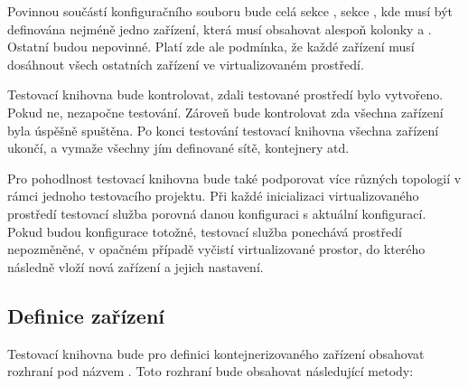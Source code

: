 Povinnou součástí konfiguračního souboru bude celá sekce , sekce , kde musí být definována nejméně jedno zařízení, která musí obsahovat alespoň kolonky  a . Ostatní budou nepovinné. Platí zde ale podmínka, že každé zařízení musí dosáhnout všech ostatních zařízení ve virtualizovaném prostředí.

Testovací knihovna bude kontrolovat, zdali testované prostředí bylo vytvořeno. Pokud ne, nezapočne testování. Zároveň bude kontrolovat zda všechna zařízení byla úspěšně spuštěna. Po konci testování testovací knihovna všechna zařízení ukončí, a vymaže všechny jím definované sítě, kontejnery atd.

Pro pohodlnost testovací knihovna bude také podporovat více různých topologií v rámci jednoho testovacího projektu. Při každé inicializaci virtualizovaného prostředí testovací služba porovná danou konfiguraci s aktuální konfigurací. Pokud budou konfigurace totožné, testovací služba ponechává prostředí nepozměněné, v opačném případě vyčistí virtualizované prostor, do kterého následně vloží nová zařízení a jejich nastavení. 

\subsection{Definice zařízení}\label{sec:cont_design}

Testovací knihovna bude pro definici kontejnerizovaného zařízení obsahovat rozhraní pod názvem . Toto rozhraní bude obsahovat následující metody:

